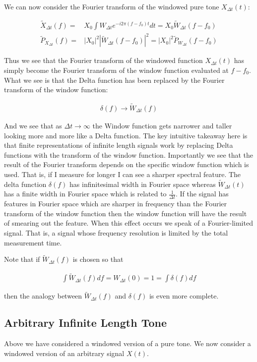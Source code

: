 \documentclass[12pt]{article}
\begin{document}
We can now consider the Fourier transform of the windowed pure tone $X_{\Delta t}(t)$:

\begin{align}
\tilde{X}_{\Delta t}(f) =& X_0\int W_{\Delta t}e^{-i 2\pi (f-f_0) t} dt = X_0 \tilde{W}_{\Delta t}(f-f_0)\\
\tilde{P}_{X_{\Delta t}}(f) =& |X_0|^2|\tilde{W}_{\Delta t}(f-f_0)|^2 = |X_0|^2 \tilde{P}_{W_{\Delta t}}(f-f_0)
\end{align}

Thus we see that the Fourier transform of the windowed function $X_{\Delta t}(t)$ has simply become the Fourier transform of the window function evaluated at $f-f_0$.
What we see is that the Delta function has been replaced by the Fourier transform of the window function:

\begin{align}
\delta(f) \rightarrow \tilde{W}_{\Delta t}(f)
\end{align}

And we see that as $\Delta t \rightarrow \infty$ the Window function gets narrower and taller looking more and more like a Delta function.
The key intuitive takeaway here is that finite representations of infinite length signals work by replacing Delta functions with the transform of the window function.
Importantly we see that the result of the Fourier transform depends on the specific window function which is used.
That is, if I measure for longer I can see a sharper spectral feature. 
The delta function $\delta(f)$ has infinitesimal width in Fourier space whereas $\tilde{W}_{\Delta t}(t)$ has a finite width in Fourier space which is related to $\frac{1}{\Delta t}$.
If the signal has features in Fourier space which are sharper in frequency than the Fourier transform of the window function then the window function will have the result of smearing out the feature.
When this effect occurs we speak of a Fourier-limited signal.
That is, a signal whose frequency resolution is limited by the total measurement time.


Note that if $\tilde{W}_{\Delta t}(f)$ is chosen so that

\begin{align}
\int \tilde{W}_{\Delta t}(f) df = W_{\Delta t}(0) = 1 = \int \delta (f) df
\end{align}

then the analogy between $\tilde{W}_{\Delta t}(f)$ and $\delta(f)$ is even more complete.

\subsection{Arbitrary Infinite Length Tone}
Above we have considered a windowed version of a pure tone.
We now consider a windowed version of an arbitrary signal $X(t)$.
\end{document}
